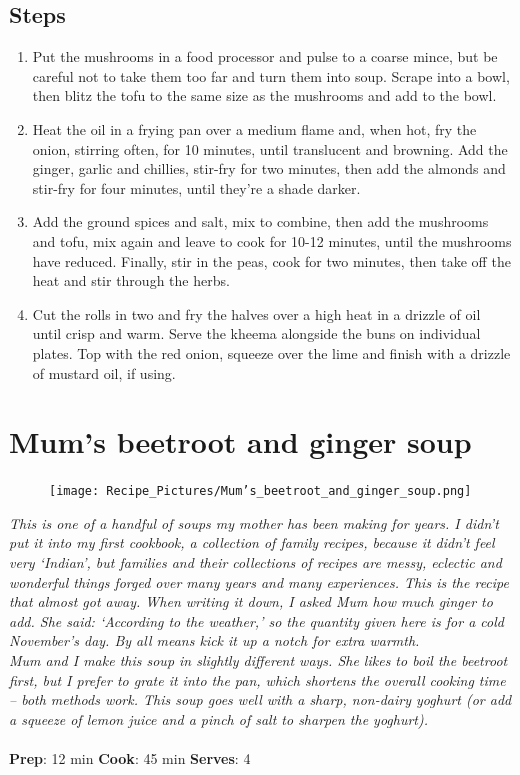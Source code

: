 \documentclass{book}
\begin{document}
\subsection*{Steps}
\begin{enumerate}
\item Put the mushrooms in a food processor and pulse to a coarse mince, but be careful not to take them too far and turn them into soup. Scrape into a bowl, then blitz the tofu to the same size as the mushrooms and add to the bowl.
\item Heat the oil in a frying pan over a medium flame and, when hot, fry the onion, stirring often, for 10 minutes, until translucent and browning. Add the ginger, garlic and chillies, stir-fry for two minutes, then add the almonds and stir-fry for four minutes, until they’re a shade darker.
\item Add the ground spices and salt, mix to combine, then add the mushrooms and tofu, mix again and leave to cook for 10-12 minutes, until the mushrooms have reduced. Finally, stir in the peas, cook for two minutes, then take off the heat and stir through the herbs.
\item Cut the rolls in two and fry the halves over a high heat in a drizzle of oil until crisp and warm. Serve the kheema alongside the buns on individual plates. Top with the red onion, squeeze over the lime and finish with a drizzle of mustard oil, if using.
\end{enumerate}
\newpage

\section{Mum’s beetroot and ginger soup}
\begin{figure}
\centering\texttt{[image: Recipe\_Pictures/Mum’s\_beetroot\_and\_ginger\_soup.png]}
\end{figure}
\emph{This is one of a handful of soups my mother has been making for years. I didn’t put it into my first cookbook, a collection of family recipes, because it didn’t feel very ‘Indian’, but families and their collections of recipes are messy, eclectic and wonderful things forged over many years and many experiences. This is the recipe that almost got away. When writing it down, I asked Mum how much ginger to add. She said: ‘According to the weather,’ so the quantity given here is for a cold November’s day. By all means kick it up a notch for extra warmth.\\ 
Mum and I make this soup in slightly different ways. She likes to boil the beetroot first, but I prefer to grate it into the pan, which shortens the overall cooking time – both methods work. This soup goes well with a sharp, non-dairy yoghurt (or add a squeeze of lemon juice and a pinch of salt to sharpen the yoghurt).}\\\\ 
\textbf{Prep}: 12 min
\textbf{Cook}: 45 min
\textbf{Serves}: 4
\end{document}

